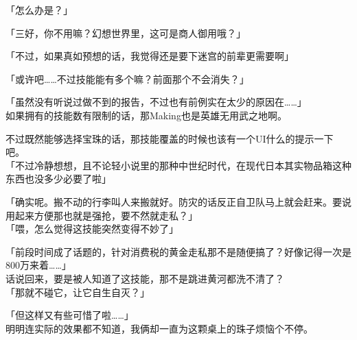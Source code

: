 「怎么办是？」

「三好，你不用嘛？幻想世界里，这可是商人御用哦？」

「不过，如果真如预想的话，我觉得还是要下迷宫的前辈更需要啊」

「或许吧……不过技能能有多个嘛？前面那个不会消失？」

「虽然没有听说过做不到的报告，不过也有前例实在太少的原因在……」\\

如果拥有的技能数有限制的话，那Making也是英雄无用武之地啊。

不过既然能够选择宝珠的话，那技能覆盖的时候也该有一个UI什么的提示一下吧。\\

「不过冷静想想，且不论轻小说里的那种中世纪时代，在现代日本其实物品箱这种东西也没多少必要了啦」

「确实呢。搬不动的行李叫人来搬就好。防灾的话反正自卫队马上就会赶来。要说用起来方便那也就是强抢，要不然就走私？」\\

「喂，怎么觉得这技能突然变得不妙了」

「前段时间成了话题的，针对消费税的黄金走私那不是随便搞了？好像记得一次是800万来着……」\\

话说回来，要是被人知道了这技能，那不是跳进黄河都洗不清了？\\

「那就不碰它，让它自生自灭？」

「但这样又有些可惜了啦……」\\

明明连实际的效果都不知道，我俩却一直为这颗桌上的珠子烦恼个不停。\\
